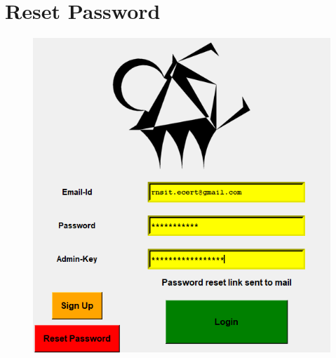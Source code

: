 \section{Reset Password}


\begin{figure}[H]
	\centering
	\includegraphics[width=0.6\linewidth]{images/login_page/login_7}
	\label{fig:login7}
\end{figure}





